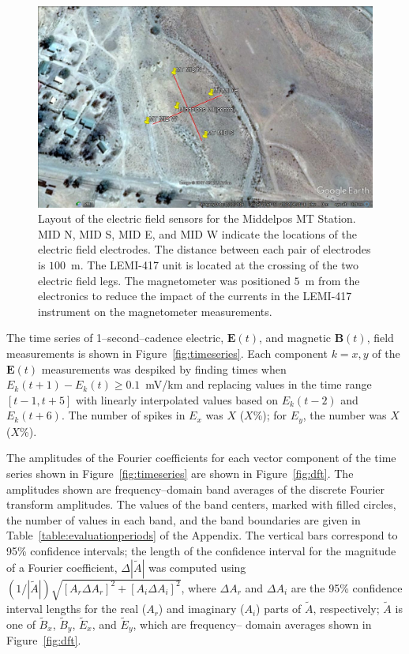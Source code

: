 \documentclass[draft,linenumbers]{agujournal2018}
\begin{document}
\begin{figure}[h]
  \centering
  \includegraphics[width=\textwidth]{figures/site.png}
  \caption{Layout of the electric field sensors for the Middelpos MT Station. MID N, MID S, MID E, and MID W indicate the locations of the electric field electrodes. The distance between each pair of electrodes is $100$~m. The LEMI-417 unit is located at the crossing of the two electric field legs. The magnetometer was positioned $5$~m from the electronics to reduce the impact of the currents in the LEMI-417 instrument on the magnetometer measurements. 
}
 \label{fig:site}
\end{figure}

The time series of 1--second--cadence electric, $\mathbf{E}(t)$, and magnetic $\mathbf{B}(t)$, field measurements is shown in Figure~\ref{fig:timeseries}. Each component $k=x, y$ of the $\mathbf{E}(t)$ measurements was despiked by finding times when $E_k(t+1)-E_k(t)\ge 0.1$~mV/km and replacing values in the time range $[t-1, t+5]$ with linearly interpolated values based on $E_k(t-2)$ and $E_k(t+6)$. The number of spikes in $E_x$ was $X$ ($X$\%); for $E_y$, the number was $X$ ($X$\%).

The amplitudes of the Fourier coefficients for each vector component of the time series shown in Figure~\ref{fig:timeseries} are shown in Figure~\ref{fig:dft}. The amplitudes shown are frequency--domain band averages of the discrete Fourier transform amplitudes. The values of the band centers, marked with filled circles, the number of values in each band, and the band boundaries are given in Table~\ref{table:evaluationperiods} of the Appendix. The vertical bars correspond to 95\% confidence intervals; the length of the confidence interval for the magnitude of a Fourier coefficient, $\Delta|\widetilde{A}|$ was computed using $(1/|\widetilde{A}|)\sqrt{[A_r\Delta A_r]^2 + [A_i\Delta A_i]^2}$, where $\Delta A_r$ and $\Delta A_i$ are the 95\% confidence interval lengths for the real ($A_r$) and imaginary ($A_i$) parts of $\widetilde{A}$, respectively; $\widetilde{A}$ is one of $\widetilde{B}_x$, $\widetilde{B}_y$, $\widetilde{E}_x$, and $\widetilde{E}_y$, which are frequency-- domain averages shown in Figure~\ref{fig:dft}.
\newpage
\end{document}
